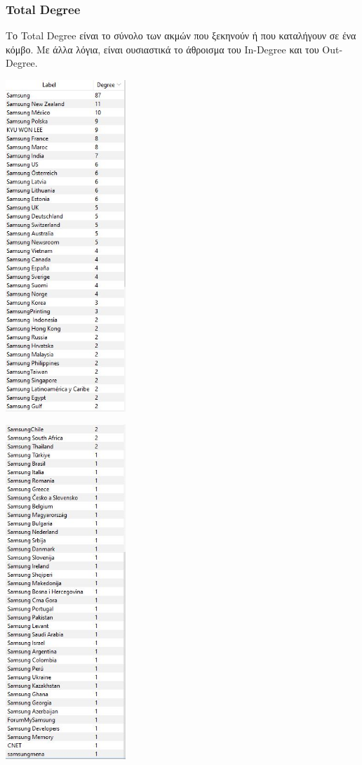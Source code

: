 \documentclass[12pt]{article}
\begin{document}
	\newpage
	\subsubsection{Total Degree} %
	Το Total Degree είναι το σύνολο των ακμών που ξεκηνούν ή που καταλήγουν σε ένα κόμβο. Με άλλα λόγια, είναι ουσιαστικά το άθροισμα του In-Degree και του Out-Degree.
	\begin{center}
		\begin{adjustbox}{valign=t}
			\includegraphics[width=0.34\textwidth]{photos-files/section6/total-degree1.JPG}
		\end{adjustbox}
		\hfill
		\begin{adjustbox}{valign=t}
			\includegraphics[width=0.34\textwidth]{photos-files/section6/total-degree2.JPG}
		\end{adjustbox}
	\end{center}
\end{document}
